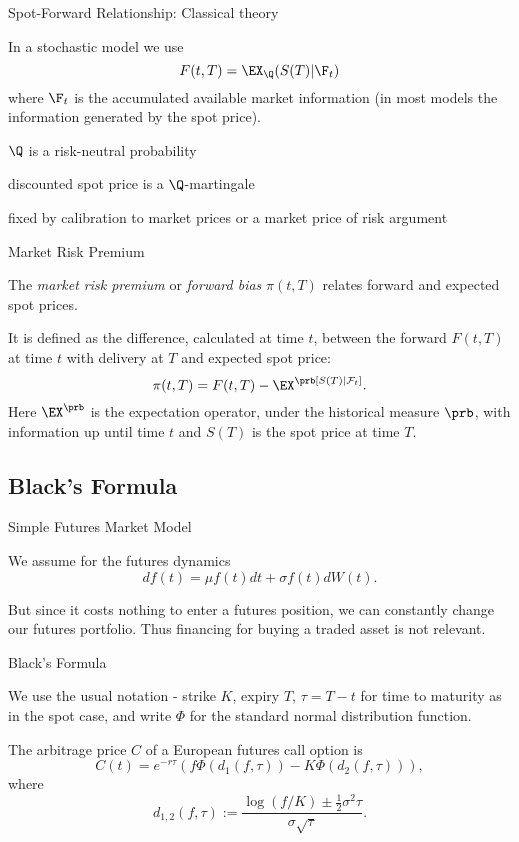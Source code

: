 {Spot-Forward Relationship: Classical theory}
\item<1-> In a stochastic model we use
$$
F(t,T)=\EX_{\Q}(S(T)|\F_t)
$$
where $\F_t$ is the accumulated available market information (in most models the information generated by the spot price).
\item<2-> $\Q$ is a risk-neutral probability
\item discounted spot price is a $\Q$-martingale
\item fixed by calibration to market prices or a market price of risk argument

{Market Risk Premium}
\item<1-> The \emph{market risk premium} or \emph{forward bias} $\pi (t,T)$
relates forward and expected spot prices.
\item<2-> It is defined as the difference, calculated at time $t$, between
the forward $F(t,T)$ at time $t$ with delivery at $T$ and expected
spot price:
\begin{equation}\label{forward risk premium}
\pi(t,T)= F(t,T)-\EX^\prb[S(T)|\mathcal F_t].
\end{equation}
Here $\EX^\prb$ is the expectation operator, under the
historical measure $\prb$, with information up until time $t$ and
$S(T)$ is the spot price at time $T$.

\subsection{Black's Formula}

{Simple Futures Market Model}
\item<1-> We assume for the futures dynamics
$$
df(t) = \mu f(t) dt + \sigma f(t) dW(t).
$$
\item<2-> But since it costs nothing to enter a futures position, we can constantly change our futures portfolio.
Thus financing for buying a traded asset is not relevant.

{Black's Formula}

\item<1-> We use the usual notation -
strike $K$, expiry $T$, $\tau=T-t$ for time to maturity as in the spot case, and write $\Phi$ for the
standard normal distribution function.
\item<2->
The arbitrage price $C$ of a European futures call option is
\begin{equation}\label{Black}
C(t)= e^{-r\tau} (f \Phi(d_1 (f,\tau)) - K \Phi(d_2 (f,\tau))),
\end{equation}
where
$$
d_{1,2} (f,\tau) := \frac{\log (f/K) \pm \frac{1}{2} {\sigma}^2 \tau}{
\sigma \sqrt{\tau}}.
$$

